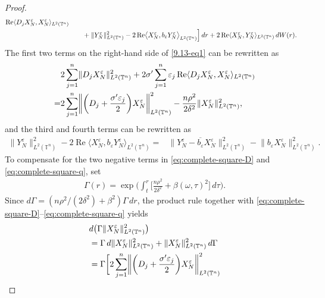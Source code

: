 \documentclass[print,wide]{draft}
\begin{document}
\begin{proof}
\begin{align}
\operatorname{Re}\langle D_jX_N^\varepsilon,X_N^\varepsilon\rangle_{L^2(\mathbb{T}^n)}\notag\\
&\qquad
+\lVert Y_N^\varepsilon\rVert_{L^2(\mathbb{T}^n)}^2
-2\operatorname{Re}\bigl\langle X_N^\varepsilon,b_\varepsilon Y_N^\varepsilon\bigr\rangle_{L^2(\mathbb{T}^n)}
\Big]\,dr
+2\operatorname{Re}\langle X_N^\varepsilon,Y_N^\varepsilon\rangle_{L^2(\mathbb{T}^n)}\,dW(r).
\end{align}
The first two terms on the right-hand side of \eqref{9.13-eq1} can be rewritten as
\begin{align}
&2\sum_{j=1}^n\lVert D_jX_N^\varepsilon\rVert_{L^2(\mathbb{T}^n)}^2
+2\sigma'\sum_{j=1}^n\varepsilon_j
\operatorname{Re}\langle D_jX_N^\varepsilon,X_N^\varepsilon\rangle_{L^2(\mathbb{T}^n)}\notag\\
= &2\sum_{j=1}^n
\biggl\lVert \biggl(D_j+\frac{\sigma'\varepsilon_j}2\biggr)
X_N^\varepsilon\biggr\rVert_{L^2(\mathbb{T}^n)}^2
-\frac{n\rho^2}{2\delta^2}\lVert X_N^\varepsilon\rVert_{L^2(\mathbb{T}^n)}^2,
\label{eq:complete-square-D}
\end{align}
and the third and fourth terms can be rewritten as
\begin{align}
\lVert Y_N^\varepsilon\rVert_{L^2(\mathbb{T}^n)}^2
-2\operatorname{Re}\bigl\langle X_N^\varepsilon,b_\varepsilon Y_N^\varepsilon\bigr\rangle_{L^2(\mathbb{T}^n)}
={}&\bigl\lVert Y_N^\varepsilon-
\overline{b_\varepsilon}X_N^\varepsilon\bigr\rVert_{L^2(\mathbb{T}^n)}^2
-\lVert b_\varepsilon X_N^\varepsilon\rVert_{L^2(\mathbb{T}^n)}^2.
\label{eq:complete-square-q}
\end{align}
To compensate for the two negative terms in \eqref{eq:complete-square-D} and \eqref{eq:complete-square-q}, set
\begin{align*}
\Gamma(r)=\exp\biggl(\int_t^r
\biggl[\frac{n\rho^2}{2\delta^2}+\beta(\omega,\tau)^2\biggr]
\,d\tau\biggr).
\end{align*}
Since \(d\Gamma=(n\rho^2/(2\delta^2)+\beta^2)\Gamma\,dr\), the product rule
together with \eqref{eq:complete-square-D}--\eqref{eq:complete-square-q} yields
\begin{align}
&d\bigl(\Gamma\lVert X_N^\varepsilon\rVert_{L^2(\mathbb{T}^n)}^2\bigr)\notag
\\ &= \Gamma\,d\lVert X_N^\varepsilon\rVert_{L^2(\mathbb{T}^n)}^2
+\lVert X_N^\varepsilon\rVert_{L^2(\mathbb{T}^n)}^2\,d\Gamma 
\label{eq:weighted-positive-identity}
\\
&= \Gamma\biggl[
2\sum_{j=1}^n\biggl\lVert \biggl(D_j+\frac{\sigma'\varepsilon_j}2\biggr)
X_N^\varepsilon\biggr\rVert_{L^2(\mathbb{T}^n)}^2

\end{align}
\end{proof}
\end{document}
